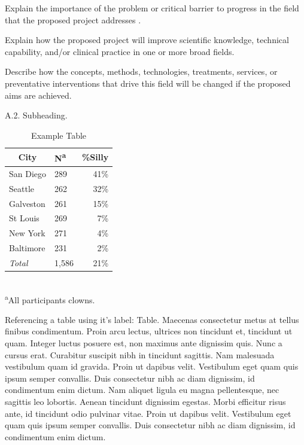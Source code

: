 \documentclass[11pt, notitlepage]{article} %
\begin{document}
Explain the importance of the problem or critical barrier to progress in the field that the proposed project addresses 
\cite{Spahn2011}.

Explain how the proposed project will improve scientific knowledge, technical capability, and/or clinical practice in one or more broad fields.

Describe how the concepts, methods, technologies, treatments, services, or preventative interventions that drive this field will be changed if the proposed aims are achieved.

\begin{description}
	\item[A.2. Subheading.]{}
\end{description}

\begin{table}\label{tab:example} %
	\caption{Example Table}
	\begin{center}
		\begin{tabular}{l l r}
			\toprule
			\multicolumn{1}{c}{City} & {N\textsuperscript{a}} & {\%Silly}\\
			\midrule
			San Diego & 289 & 41\%\\
			Seattle & 262 & 32\%\\
			Galveston & 261 & 15\%\\
			St Louis & 269 & 7\%\\
			New York & 271 & 4\%\\
			Baltimore & 231 & 2\%\\
			\emph{Total} & 1,586 & 21\%\\
			\hline 
		\end{tabular}\\
		\footnotesize\textsuperscript{a}{All participants clowns.}
	\end{center}	
\end{table}

Referencing a table using it's label: Table. Maecenas consectetur metus at tellus finibus condimentum. Proin arcu lectus, ultrices non tincidunt et, tincidunt ut quam. Integer luctus posuere est, non maximus ante dignissim quis. Nunc a cursus erat. Curabitur suscipit nibh in tincidunt sagittis. Nam malesuada vestibulum quam id gravida. Proin ut dapibus velit. Vestibulum eget quam quis ipsum semper convallis. Duis consectetur nibh ac diam dignissim, id condimentum enim dictum. Nam aliquet ligula eu magna pellentesque, nec sagittis leo lobortis. Aenean tincidunt dignissim egestas. Morbi efficitur risus ante, id tincidunt odio pulvinar vitae. Proin ut dapibus velit. Vestibulum eget quam quis ipsum semper convallis. Duis consectetur nibh ac diam dignissim, id condimentum enim dictum.
\end{document}
